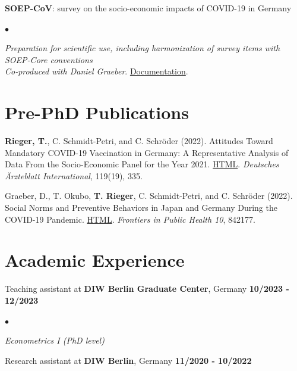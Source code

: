 \documentclass[margin, line]{res}
\newlength{\secvspace}
\newlength{\linevspace}
\newlength{\listvspace}
\newenvironment{list2}{
  \begin{list}{$\bullet$}{%
      \setlength{\itemsep}{0in}
      \setlength{\parsep}{0in} \setlength{\parskip}{0in}
      \setlength{\topsep}{0in} \setlength{\partopsep}{0in}
      \setlength{\leftmargin}{0.2in}}}{\end{list}}
\begin{document}
\begin{resume}
\textbf{SOEP-CoV}: survey on the socio-economic impacts of COVID-19 in Germany \\
\vspace*{\listvspace}
\begin{list2}
\item[] \textit{Preparation for scientific use, including harmonization of survey items with SOEP-Core conventions} \\
\textit{Co-produced with Daniel Graeber}. \href{https://www.diw.de/documents/publikationen/73/diw_01.c.842706.de/diw_ssp1133.pdf}{Documentation}.
\end{list2}
\vspace{\secvspace}

\section{Pre-PhD Publications}
\textbf{Rieger, T.}, C. Schmidt-Petri, and C. Schröder (2022). Attitudes Toward Mandatory COVID-19 Vaccination in Germany: A Representative Analysis of Data From the Socio-Economic Panel for the Year 2021. \href{https://pmc.ncbi.nlm.nih.gov/articles/PMC9468473/}{HTML}. \textit{Deutsches Ärzteblatt International}, 119(19), 335.
\vspace{\listvspace}

Graeber, D., T. Okubo, \textbf{T. Rieger}, C. Schmidt-Petri, and C. Schröder (2022). Social Norms and Preventive Behaviors in Japan and Germany During the COVID-19 Pandemic. \href{https://www.frontiersin.org/journals/public-health/articles/10.3389/fpubh.2022.842177/full}{HTML}. \textit{Frontiers in Public Health 10}, 842177.

\section{ Academic Experience}
Teaching assistant at {\bf DIW Berlin Graduate Center}, Germany \hfill {\bf 10/2023 - 12/2023} \\
\vspace*{\listvspace}
\begin{list2}
\item[] \textit{Econometrics I (PhD level)}
\end{list2}
\vspace{\listvspace}

Research assistant at {\bf DIW Berlin}, Germany \hfill {\bf 11/2020 - 10/2022} \\
\vspace{\linevspace}


\end{resume}
\end{document}
